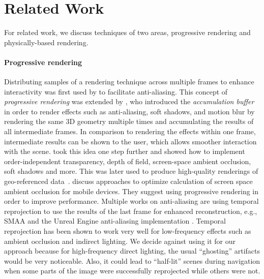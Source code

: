 \documentclass[sigconf,authorversion]{acmart}
\begin{document}
\section{Related Work}
For related work, we discuss techniques of two areas, progressive rendering and physically-based rendering.

\paragraph{Progressive rendering}
Distributing samples of a rendering technique across multiple frames to enhance interactivity was first used by \cite{fuchs1985fast} to facilitate anti-aliasing.
This concept of \textit{progressive rendering} was extended by \cite{haeberli1990accumulation}, who introduced the \textit{accumulation buffer} in order to render effects such as anti-aliasing, soft shadows, and motion blur by rendering the same 3D geometry multiple times and accumulating the results of all intermediate frames.
In comparison to rendering the effects within one frame, intermediate results can be shown to the user, which allows smoother interaction with the scene.
\cite{limberger2016progressive} took this idea one step further and showed how to implement order-independent transparency, depth of field, screen-space ambient occlusion, soft shadows and more.
This was later used to produce high-quality renderings of geo-referenced data~\cite{limberger2017cartography}.
\cite{sunet2016optimized} discuss approaches to optimize calculation of screen space ambient occlusion for mobile devices.
They suggest using progressive rendering in order to improve performance.
Multiple works on anti-aliasing are using temporal reprojection to use the results of the last frame for enhanced reconstruction,
e.g., SMAA \cite{jimenez2012smaa} and the Unreal Engine anti-aliasing implementation \cite{karis2014high}.
Temporal reprojection has been shown to work very well for low-frequency effects such as ambient occlusion and indirect lighting.
We decide against using it for our approach because for high-frequency direct lighting, the usual \enquote{ghosting} artifacts would be very noticeable.
Also, it could lead to \enquote{half-lit} scenes during navigation when some parts of the image were successfully reprojected while others were not.
\end{document}
